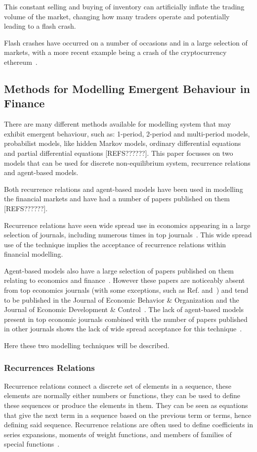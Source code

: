\documentclass{article}
\begin{document}
This constant selling and buying of inventory can artificially inflate the trading volume of the market, changing how many traders operate and potentially leading to a flash crash.

Flash crashes have occurred on a number of occasions and in a large selection of markets, with a more recent example being a crash of the cryptocurrency ethereum~\cite{cryptocrash}.


\subsection{Methods for Modelling Emergent Behaviour in Finance}  \label{litreviewofabmrr} 
There are many different methods available for modelling system that may exhibit emergent behaviour, such as: 1-period, 2-period and multi-period models, probabilist models, like hidden Markov models, ordinary differential equations and partial differential equations [REFS??????]. This paper focusses on two models that can be used for discrete non-equilibrium system, recurrence relations and agent-based models. 

Both recurrence relations and agent-based models have been used in modelling the financial markets and have had a number of papers published on them [REFS??????].

Recurrence relations have seen wide spread use in economics appearing in a large selection of journals, including numerous times in top journals~\cite{rra10, rra1, rra2, rra3, rra4, rra5, rra6, rra7, rra8, rra9}. This wide spread use of the technique implies the acceptance of recurrence relations within financial modelling.      

Agent-based models also have a large selection of papers published on them relating to economics and finance~\cite{ abma2, abma3, abma4}. However these papers are noticeably absent from top economics journals (with some exceptions, such as Ref.\cite{abmexp1} and~\cite{abmexp2}) and tend to be published in the Journal of Economic Behavior \& Organization and the Journal of Economic Development \& Control~\cite{whereabmp, farmerfoleynature}. The lack of agent-based models present in top economic journals combined with the number of papers published in other journals shows the lack of wide spread acceptance for this technique~\cite{agbntj, econmistsnoabm, lob_noecomimists}.

Here these two modelling techniques will be described.  


\subsubsection{Recurrences Relations} 
Recurrence relations connect a discrete set of elements in a sequence, these elements are normally either numbers or functions, they can be used to define these sequences or produce the elements in them. They can be seen as equations that give the next term in a sequence based on the previous term or terms, hence defining said sequence. Recurrence relations are often used to define coefficients in series expansions, moments of weight functions, and members of families of special functions~\cite{recurrelationbook}.
\end{document}
